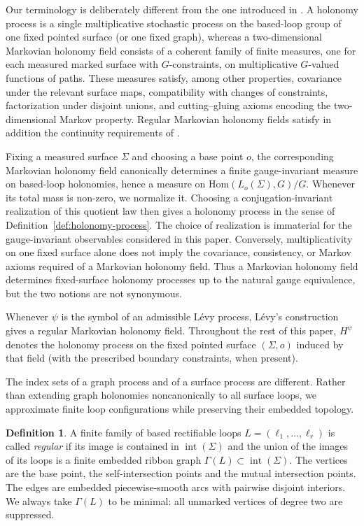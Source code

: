 \documentclass[11pt,a4paper,reqno]{article}
\theoremstyle{definition}
\newtheorem{definition}[theorem]{Definition}
\theoremstyle{remark}
\newcommand\Hom{\mathrm{Hom}}
\begin{document}
Our terminology is deliberately different from the one introduced in \cite{Lev10}. A holonomy process is a single multiplicative stochastic process on the based-loop group of one fixed pointed surface (or one fixed graph), whereas a two-dimensional Markovian holonomy field consists of a coherent family of finite measures, one for each measured marked surface with $G$-constraints, on multiplicative $G$-valued functions of paths. These measures satisfy, among other properties, covariance under the relevant surface maps, compatibility with changes of constraints, factorization under disjoint unions, and cutting--gluing axioms encoding the two-dimensional Markov property. Regular Markovian holonomy fields satisfy in addition the continuity requirements of \cite[Definition~3.1.3]{Lev10}.

Fixing a measured surface $\Sigma$ and choosing a base point $o$, the corresponding Markovian holonomy field canonically determines a finite gauge-invariant measure on based-loop holonomies, hence a measure on $\Hom(L_o(\Sigma),G)/G$. Whenever its total mass is non-zero, we normalize it. Choosing a conjugation-invariant realization of this quotient law then gives a holonomy process in the sense of Definition~\ref{def:holonomy-process}. The choice of realization is immaterial for the gauge-invariant observables considered in this paper. Conversely, multiplicativity on one fixed surface alone does not imply the covariance, consistency, or Markov axioms required of a Markovian holonomy field. Thus a Markovian holonomy field determines fixed-surface holonomy processes up to the natural gauge equivalence, but the two notions are not synonymous.

Whenever $\psi$ is the symbol of an admissible L\'evy process, L\'evy's construction \cite[Theorem~4.3.1]{Lev10} gives a regular Markovian holonomy field. Throughout the rest of this paper, $H^\psi$ denotes the holonomy process on the fixed pointed surface $(\Sigma,o)$ induced by that field (with the prescribed boundary constraints, when present).

The index sets of a graph process and of a surface process are different. Rather than extending graph holonomies noncanonically to all surface loops, we approximate finite loop configurations while preserving their embedded topology.

\begin{definition}\label{def:regular-loop-family}
A finite family of based rectifiable loops $L=(\ell_1,\ldots,\ell_r)$ is called \emph{regular} if its image is contained in $\operatorname{int}(\Sigma)$ and the union of the images of its loops is a finite embedded ribbon graph $\Gamma(L)\subset\operatorname{int}(\Sigma).$ The vertices are the base point, the self-intersection points and the mutual intersection points. The edges are embedded piecewise-smooth arcs with pairwise disjoint interiors. We always take $\Gamma(L)$ to be minimal: all unmarked vertices of degree two are suppressed.
\end{definition}
\end{document}
